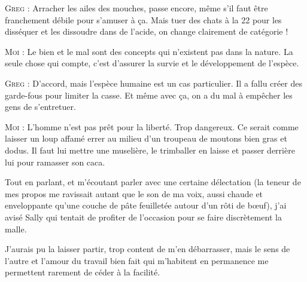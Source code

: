 \begin{dialogue}
\textsc{Greg} : Arracher les ailes des mouches, passe encore, même s’il faut être franchement débile pour s’amuser à ça. Mais tuer des chats à la 22 pour les disséquer et les dissoudre dans de l’acide, on change clairement de catégorie !

\textsc{Moi} : Le bien et le mal sont des concepts qui n’existent pas dans la nature. La seule chose qui compte, c’est d’assurer la survie et le développement de l’espèce.

\textsc{Greg} : D’accord, mais l’espèce humaine est un cas particulier. Il a fallu créer des garde-fous pour limiter la casse. Et même avec ça, on a du mal à empêcher les gens de s’entretuer.

\label{rat:37}%
\textsc{Moi} : L’homme n’est pas prêt pour la liberté. Trop dangereux. Ce serait comme laisser un loup affamé errer au milieu d’un troupeau de moutons bien gras et dodus. Il faut lui mettre une muselière, le trimballer en laisse et passer derrière lui pour ramasser son caca.

\end{dialogue}

Tout en parlant, et m’écoutant parler avec une certaine délectation (la teneur de mes propos me ravissait autant que le son de ma voix, aussi chaude et enveloppante qu’une couche de pâte feuilletée autour d’un rôti de bœuf), j’ai avisé Sally qui tentait de profiter de l’occasion pour se faire discrètement la malle.

J’aurais pu la laisser partir, trop content de m’en débarrasser, mais le sens de l’autre et l’amour du travail bien fait qui m’habitent en permanence me permettent rarement de céder à la facilité.

